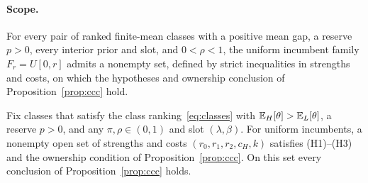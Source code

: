 \paragraph{Scope.}\label{par:uniform-classes-scope}
For every pair of ranked finite-mean classes with a positive mean gap, a reserve \(p>0\), every interior prior and slot, and
\(0<\rho<1\), the uniform incumbent family \(F_r=U[0,r]\) admits a nonempty set, defined by strict inequalities
in strengths and costs, on which the hypotheses and ownership conclusion of Proposition~\ref{prop:ccc} hold.


\begin{proposition}\label{prop:classes}
Fix classes that satisfy the class ranking~\eqref{eq:classes} with \(\mathbb{E}_H[\theta]>\mathbb{E}_L[\theta]\), a reserve \(p>0\), and
any \(\pi,\rho\in(0,1)\) and slot \((\lambda,\beta)\). For uniform incumbents, a nonempty open set of strengths and
costs \((r_0,r_1,r_2,c_H,k)\) satisfies (H1)--(H3) and the ownership condition of Proposition~\ref{prop:ccc}. On this
set every conclusion of Proposition~\ref{prop:ccc} holds.
\end{proposition}

